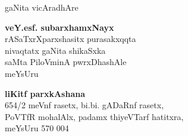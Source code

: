 \thispagestyle{empty}
\begin{center}
{\fontsize{30}{32}\selectfont gaNita vicAradhAre}
\vfill


{\LARGE\bfseries veY.esf. subarxhamxNayx}\\[4pt]
   {\large rASaTxrXparxshasitx purasakxqqta\\[4pt]
   nivaqtatx gaNita shikaSxka\\[4pt]
   saMta PiloVminA pwrxDhashAle\\[4pt]
   meYsUru}

\vfill


{{\LARGE\bfseries liKitf parxkAshana}\\[5pt]
{\rm 654/2} meVnf rasetx, bi.bi. gADaRnf rasetx, \\
PoVTfR mohalAlx, padamx thiyeVTarf hatitxra,\\
meYsUru 570 004}


\end{center}
